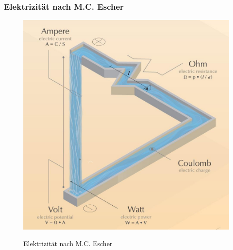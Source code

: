 \begin{frame}
	\frametitle{Elektrizität nach M.C. Escher}
\begin{figure}
	\includegraphics[width=\textwidth,height=.8\textheight,keepaspectratio]{e03/electricity_crop.jpg}\\
	\caption{Elektrizität nach M.C. Escher \cite{escher}}
	\label{fig_escher}
\end{figure}	
\end{frame}


